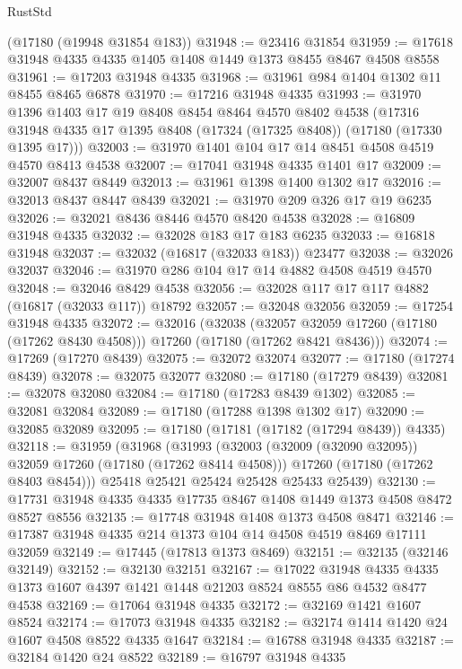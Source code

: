 \begin{lexlean}{RustStd}
\begin{coremodule}
    (@17180 (@19948 @31854 @183))
@31948 := @23416 @31854
@31959 := @17618 @31948 @4335 @4335 @1405 @1408 @1449 @1373 @8455 @8467 @4508 @8558
@31961 := @17203 @31948 @4335
@31968 := @31961 @984 @1404 @1302 @11 @8455 @8465 @6878
@31970 := @17216 @31948 @4335
@31993 := @31970
    @1396
    @1403
    @17
    @19
    @8408
    @8454
    @8464
    @4570
    @8402
    @4538
    (@17316 @31948 @4335 @17 @1395 @8408 (@17324 (@17325 @8408)) (@17180 (@17330 @1395 @17)))
@32003 := @31970 @1401 @104 @17 @14 @8451 @4508 @4519 @4570 @8413 @4538
@32007 := @17041 @31948 @4335 @1401 @17
@32009 := @32007 @8437 @8449
@32013 := @31961 @1398 @1400 @1302 @17
@32016 := @32013 @8437 @8447 @8439
@32021 := @31970 @209 @326 @17 @19 @6235
@32026 := @32021 @8436 @8446 @4570 @8420 @4538
@32028 := @16809 @31948 @4335
@32032 := @32028 @183 @17 @183 @6235
@32033 := @16818 @31948
@32037 := @32032 (@16817 (@32033 @183)) @23477
@32038 := @32026 @32037
@32046 := @31970 @286 @104 @17 @14 @4882 @4508 @4519 @4570
@32048 := @32046 @8429 @4538
@32056 := @32028 @117 @17 @117 @4882 (@16817 (@32033 @117)) @18792
@32057 := @32048 @32056
@32059 := @17254 @31948 @4335
@32072 := @32016
    (@32038
      (@32057 @32059 @17260 (@17180 (@17262 @8430 @4508)))
      @17260
      (@17180 (@17262 @8421 @8436)))
@32074 := @17269 (@17270 @8439)
@32075 := @32072 @32074
@32077 := @17180 (@17274 @8439)
@32078 := @32075 @32077
@32080 := @17180 (@17279 @8439)
@32081 := @32078 @32080
@32084 := @17180 (@17283 @8439 @1302)
@32085 := @32081 @32084
@32089 := @17180 (@17288 @1398 @1302 @17)
@32090 := @32085 @32089
@32095 := @17180 (@17181 (@17182 (@17294 @8439)) @4335)
@32118 := @31959
    (@31968
      (@31993
        (@32003 (@32009 (@32090 @32095)) @32059 @17260 (@17180 (@17262 @8414 @4508)))
        @17260
        (@17180 (@17262 @8403 @8454)))
      @25418
      @25421
      @25424
      @25428
      @25433
      @25439)
@32130 := @17731 @31948 @4335 @4335 @17735 @8467 @1408 @1449 @1373 @4508 @8472 @8527 @8556
@32135 := @17748 @31948 @1408 @1373 @4508 @8471
@32146 := @17387 @31948 @4335 @214 @1373 @104 @14 @4508 @4519 @8469 @17111 @32059
@32149 := @17445 (@17813 @1373 @8469)
@32151 := @32135 (@32146 @32149)
@32152 := @32130 @32151
@32167 := @17022
    @31948
    @4335
    @4335
    @1373
    @1607
    @4397
    @1421
    @1448
    @21203
    @8524
    @8555
    @86
    @4532
    @8477
    @4538
@32169 := @17064 @31948 @4335
@32172 := @32169 @1421 @1607 @8524
@32174 := @17073 @31948 @4335
@32182 := @32174 @1414 @1420 @24 @1607 @4508 @8522 @4335 @1647
@32184 := @16788 @31948 @4335
@32187 := @32184 @1420 @24 @8522
@32189 := @16797 @31948 @4335

\end{coremodule}
\end{lexlean}
